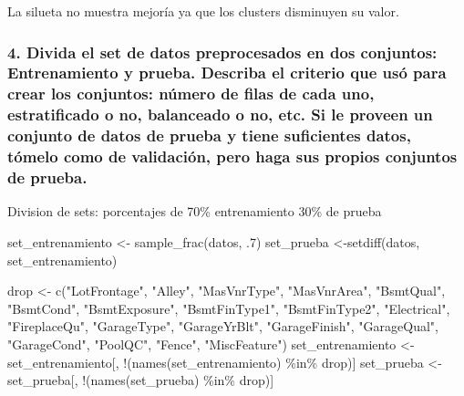 \documentclass[
]{article}
\newenvironment{Shaded}{\begin{snugshade}}{\end{snugshade}}
\newcommand{\DecValTok}[1]{\textcolor[rgb]{0.00,0.00,0.81}{#1}}
\newcommand{\FunctionTok}[1]{\textcolor[rgb]{0.00,0.00,0.00}{#1}}
\newcommand{\NormalTok}[1]{#1}
\newcommand{\OtherTok}[1]{\textcolor[rgb]{0.56,0.35,0.01}{#1}}
\newcommand{\SpecialCharTok}[1]{\textcolor[rgb]{0.00,0.00,0.00}{#1}}
\newcommand{\StringTok}[1]{\textcolor[rgb]{0.31,0.60,0.02}{#1}}
\begin{document}
La silueta no muestra mejoría ya que los clusters disminuyen su valor.

\hypertarget{divida-el-set-de-datos-preprocesados-en-dos-conjuntos-entrenamiento-y-prueba.-describa-el-criterio-que-usuxf3-para-crear-los-conjuntos-nuxfamero-de-filas-de-cada-uno-estratificado-o-no-balanceado-o-no-etc.-si-le-proveen-un-conjunto-de-datos-de-prueba-y-tiene-suficientes-datos-tuxf3melo-como-de-validaciuxf3n-pero-haga-sus-propios-conjuntos-de-prueba.}{%
\subsubsection{4. Divida el set de datos preprocesados en dos conjuntos:
Entrenamiento y prueba. Describa el criterio que usó para crear los
conjuntos: número de filas de cada uno, estratificado o no, balanceado o
no, etc. Si le proveen un conjunto de datos de prueba y tiene
suficientes datos, tómelo como de validación, pero haga sus propios
conjuntos de
prueba.}\label{divida-el-set-de-datos-preprocesados-en-dos-conjuntos-entrenamiento-y-prueba.-describa-el-criterio-que-usuxf3-para-crear-los-conjuntos-nuxfamero-de-filas-de-cada-uno-estratificado-o-no-balanceado-o-no-etc.-si-le-proveen-un-conjunto-de-datos-de-prueba-y-tiene-suficientes-datos-tuxf3melo-como-de-validaciuxf3n-pero-haga-sus-propios-conjuntos-de-prueba.}}

Division de sets: porcentajes de 70\% entrenamiento 30\% de prueba

\begin{Shaded}
\begin{Highlighting}[]
\NormalTok{set\_entrenamiento }\OtherTok{\textless{}{-}} \FunctionTok{sample\_frac}\NormalTok{(datos, .}\DecValTok{7}\NormalTok{)}
\NormalTok{set\_prueba }\OtherTok{\textless{}{-}}\FunctionTok{setdiff}\NormalTok{(datos, set\_entrenamiento)}


\NormalTok{drop }\OtherTok{\textless{}{-}} \FunctionTok{c}\NormalTok{(}\StringTok{"LotFrontage"}\NormalTok{, }\StringTok{"Alley"}\NormalTok{, }\StringTok{"MasVnrType"}\NormalTok{, }\StringTok{"MasVnrArea"}\NormalTok{, }\StringTok{"BsmtQual"}\NormalTok{, }\StringTok{"BsmtCond"}\NormalTok{, }\StringTok{"BsmtExposure"}\NormalTok{, }\StringTok{"BsmtFinType1"}\NormalTok{, }\StringTok{"BsmtFinType2"}\NormalTok{, }\StringTok{"Electrical"}\NormalTok{, }\StringTok{"FireplaceQu"}\NormalTok{, }\StringTok{"GarageType"}\NormalTok{, }\StringTok{"GarageYrBlt"}\NormalTok{, }\StringTok{"GarageFinish"}\NormalTok{, }\StringTok{"GarageQual"}\NormalTok{, }\StringTok{"GarageCond"}\NormalTok{, }\StringTok{"PoolQC"}\NormalTok{, }\StringTok{"Fence"}\NormalTok{, }\StringTok{"MiscFeature"}\NormalTok{)}
\NormalTok{set\_entrenamiento }\OtherTok{\textless{}{-}}\NormalTok{ set\_entrenamiento[, }\SpecialCharTok{!}\NormalTok{(}\FunctionTok{names}\NormalTok{(set\_entrenamiento) }\SpecialCharTok{\%in\%}\NormalTok{ drop)]}
\NormalTok{set\_prueba }\OtherTok{\textless{}{-}}\NormalTok{ set\_prueba[, }\SpecialCharTok{!}\NormalTok{(}\FunctionTok{names}\NormalTok{(set\_prueba) }\SpecialCharTok{\%in\%}\NormalTok{ drop)]}
\end{Highlighting}
\end{Shaded}
\end{document}
